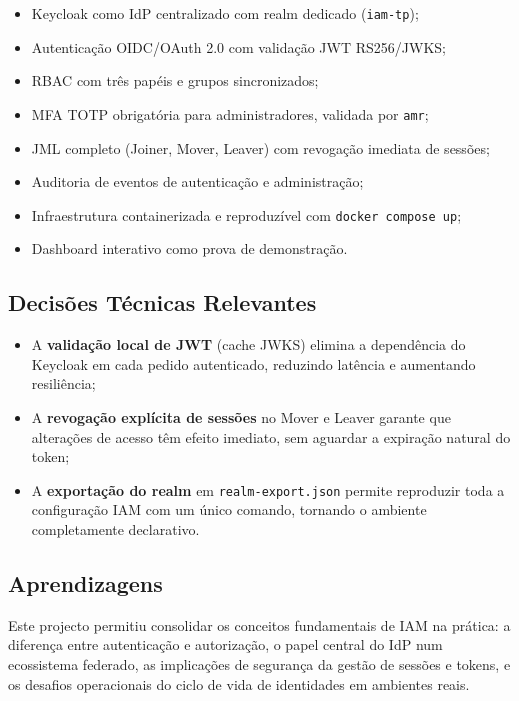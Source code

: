 \documentclass[12pt,a4paper]{article}
\begin{document}
\begin{itemize}[leftmargin=1.5cm]
  \item[$\checkmark$] Keycloak como IdP centralizado com realm dedicado (\texttt{iam-tp});
  \item[$\checkmark$] Autenticação OIDC/OAuth 2.0 com validação JWT RS256/JWKS;
  \item[$\checkmark$] RBAC com três papéis e grupos sincronizados;
  \item[$\checkmark$] MFA TOTP obrigatória para administradores, validada por \texttt{amr};
  \item[$\checkmark$] JML completo (Joiner, Mover, Leaver) com revogação imediata de sessões;
  \item[$\checkmark$] Auditoria de eventos de autenticação e administração;
  \item[$\checkmark$] Infraestrutura containerizada e reproduzível com \texttt{docker compose up};
  \item[$\checkmark$] Dashboard interativo como prova de demonstração.
\end{itemize}

\subsection{Decisões Técnicas Relevantes}

\begin{itemize}[leftmargin=1.5cm]
  \item A \textbf{validação local de JWT} (cache JWKS) elimina a dependência do Keycloak em cada pedido autenticado, reduzindo latência e aumentando resiliência;
  \item A \textbf{revogação explícita de sessões} no Mover e Leaver garante que alterações de acesso têm efeito imediato, sem aguardar a expiração natural do token;
  \item A \textbf{exportação do realm} em \texttt{realm-export.json} permite reproduzir toda a configuração IAM com um único comando, tornando o ambiente completamente declarativo.
\end{itemize}

\subsection{Aprendizagens}

Este projecto permitiu consolidar os conceitos fundamentais de IAM na prática: a diferença entre autenticação e autorização, o papel central do IdP num ecossistema federado, as implicações de segurança da gestão de sessões e tokens, e os desafios operacionais do ciclo de vida de identidades em ambientes reais.
\end{document}
